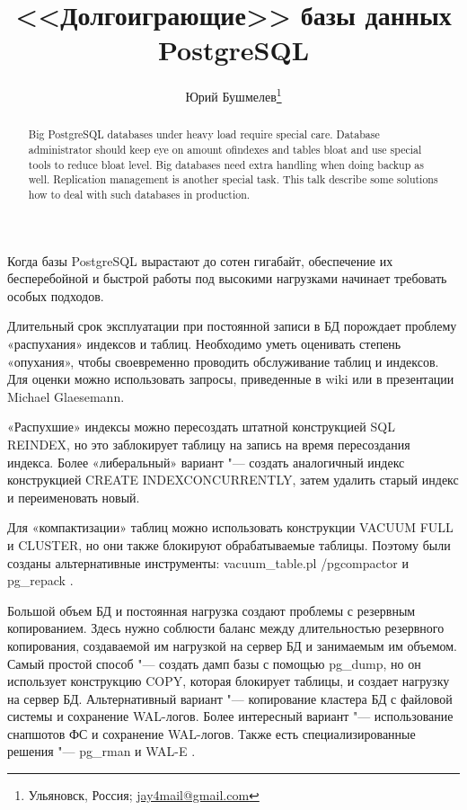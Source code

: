 \documentclass[10pt, a5paper]{article}
\begin{document}
\title{<<Долгоиграющие>> базы данных PostgreSQL}%

\author{Юрий Бушмелев\footnote{Ульяновск, Россия; \url{jay4mail@gmail.com}}}
\maketitle

\begin{abstract}
Big PostgreSQL databases under heavy load require special care. Database administrator should keep eye on amount of\linebreak indexes and tables bloat and use special tools to reduce bloat level. Big databases need extra handling when doing backup as well. Replication management is another special task. This talk describe some solutions how to deal with such databases in production.
\end{abstract}

Когда базы PostgreSQL вырастают до сотен гигабайт, обеспечение их бесперебойной и быстрой работы под высокими нагрузками начинает требовать особых подходов.

Длительный срок эксплуатации при постоянной записи в БД порождает проблему «распухания» индексов и таблиц. Необходимо уметь оценивать степень «опухания», чтобы своевременно проводить обслуживание таблиц и индексов. Для оценки можно использовать запросы, приведенные в wiki\cite{Bush1} или в презентации Michael Glaesemann\cite{Bush2}.

«Распухшие» индексы можно пересоздать штатной конструкцией SQL REINDEX, но это заблокирует таблицу на запись на время пересоздания индекса. Более «либеральный» вариант "--- создать аналогичный индекс конструкцией CREATE INDEX\linebreak CONCURRENTLY, затем удалить старый индекс и переименовать новый.

Для «компактизации» таблиц можно использовать конструкции VACUUM FULL и CLUSTER, но они также блокируют обрабатываемые таблицы. Поэтому были созданы альтернативные инструменты: vacuum\_table.pl \cite{Bush3} /pgcompactor \cite{Bush4} и pg\_repack \cite{Bush5}.

Большой объем БД и постоянная нагрузка создают проблемы с резервным копированием. Здесь нужно соблюсти баланс между длительностью резервного копирования, создаваемой им нагрузкой на сервер БД и занимаемым им объемом. Самый простой способ "--- создать дамп базы с помощью pg\_dump, но он использует конструкцию COPY, которая блокирует таблицы, и создает нагрузку на сервер БД. Альтернативный вариант "--- копирование кластера БД с файловой системы и сохранение WAL-логов. Более интересный вариант "--- использование снапшотов ФС и сохранение WAL-логов. Также есть специализированные решения "--- pg\_rman \cite{Bush6} и WAL-E \cite{Bush7}.
\end{document}
